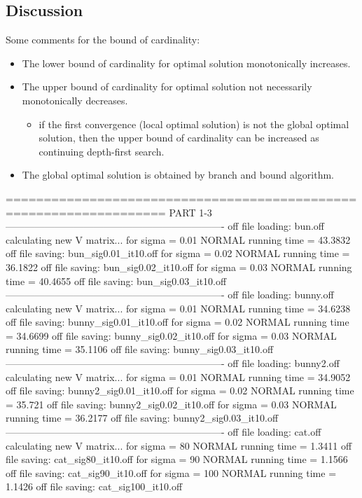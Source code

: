 \documentclass[paper=a4, fontsize=11pt]{scrartcl} %
\numberwithin{equation}{section} %
\numberwithin{figure}{section} %
\numberwithin{table}{section} %
\begin{document}
\subsection{Discussion}

Some comments for the bound of cardinality:

\begin{itemize}
\item The lower bound of cardinality for optimal solution monotonically increases. 
\item The upper bound of cardinality for optimal solution not necessarily monotonically decreases.
	\begin{itemize}
	\item if the first convergence (local optimal solution) is not the global optimal solution, then the upper bound of cardinality can be increased as continuing depth-first search.
	\end{itemize}
\item The global optimal solution is obtained by branch and bound algorithm. 
\end{itemize}

===================================================================
PART 1-3
-------------------------------------------------------------------
off file loading: bun.off
calculating new V matrix...
for sigma = 0.01
NORMAL running time = 43.3832
off file saving: bun_sig0.01_it10.off
for sigma = 0.02
NORMAL running time = 36.1822
off file saving: bun_sig0.02_it10.off
for sigma = 0.03
NORMAL running time = 40.4655
off file saving: bun_sig0.03_it10.off
-------------------------------------------------------------------
off file loading: bunny.off
calculating new V matrix...
for sigma = 0.01
NORMAL running time = 34.6238
off file saving: bunny_sig0.01_it10.off
for sigma = 0.02
NORMAL running time = 34.6699
off file saving: bunny_sig0.02_it10.off
for sigma = 0.03
NORMAL running time = 35.1106
off file saving: bunny_sig0.03_it10.off
-------------------------------------------------------------------
off file loading: bunny2.off
calculating new V matrix...
for sigma = 0.01
NORMAL running time = 34.9052
off file saving: bunny2_sig0.01_it10.off
for sigma = 0.02
NORMAL running time = 35.721
off file saving: bunny2_sig0.02_it10.off
for sigma = 0.03
NORMAL running time = 36.2177
off file saving: bunny2_sig0.03_it10.off
-------------------------------------------------------------------
off file loading: cat.off
calculating new V matrix...
for sigma = 80
NORMAL running time = 1.3411
off file saving: cat_sig80_it10.off
for sigma = 90
NORMAL running time = 1.1566
off file saving: cat_sig90_it10.off
for sigma = 100
NORMAL running time = 1.1426
off file saving: cat_sig100_it10.off
\end{document}
